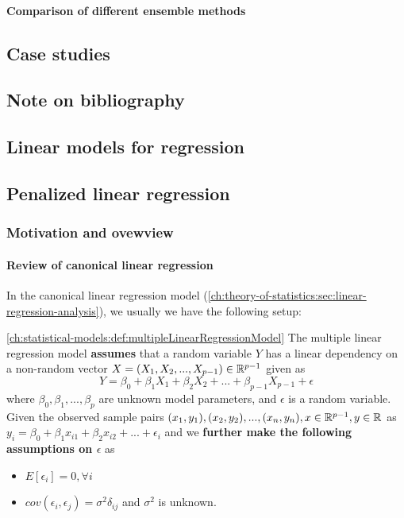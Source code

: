 \begin{refsection}
\subsubsection{Comparison of different ensemble methods}


\section{Case studies}


\section{Note on bibliography}

\end{refsection}

\begin{refsection}
	\startcontents[chapters]	
	\chapter{Linear models for regression}\label{ch:statistical-learning-linear-models}

\section{Penalized linear regression}\label{ch:statistical-learning-linear-models:sec:PenalizedLinearRegression}

\subsection{Motivation and ovewview}

\subsubsection{Review of canonical linear regression}
In the canonical linear regression model (\autoref{ch:theory-of-statistics:sec:linear-regression-analysis}), we usually we have the following setup:

\begin{definition}\autoref{ch:statistical-models:def:multipleLinearRegressionModel}
	The multiple linear regression model \textbf{assumes} that a random variable $Y$ has a linear dependency on a non-random vector $X = (X_1,X_2,...,X_{p-1}) \in \mathbb{R}^{p-1}$ given as
	$$Y = \beta_0 + \beta_1 X_1 +\beta_2 X_2 + ... +\beta_{p-1} X_{p-1} + \epsilon$$
	where $\beta_0,\beta_1, ...,\beta_p$ are unknown model parameters, and $\epsilon$ is a random variable. 
	Given the observed sample pairs $(x_1,y_1),(x_2,y_2),..., (x_n,y_n), x\in \mathbb{R}^{p-1}, y\in \mathbb{R}$ as $y_i = \beta_0 + \beta_1 x_{i1} + \beta_2 x_{i2} + ... + \epsilon_i$ and we \textbf{further make the following assumptions on $\epsilon$} as
	\begin{itemize}
		\item $E[\epsilon_i] = 0,\forall i$
		\item $cov(\epsilon_i,\epsilon_j) = \sigma^2\delta_{ij}$ and $\sigma^2$ is unknown.
	\end{itemize} 	
\end{definition}


\end{refsection}
